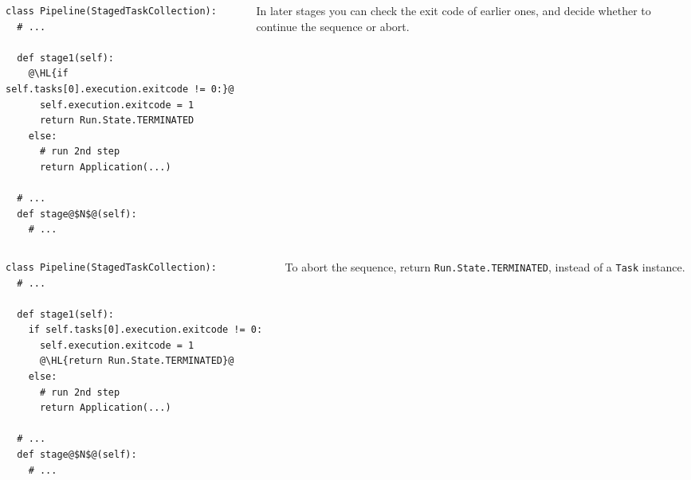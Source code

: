 \documentclass[english,serif,mathserif,xcolor=pdftex,dvipsnames,table]{beamer}
\begin{document}
\begin{frame}[fragile]
  \begin{columns}[c]
    \begin{column}{0.6\textwidth}
      \begin{lstlisting}
class Pipeline(StagedTaskCollection):
  # ...

  def stage1(self):
    @\HL{if self.tasks[0].execution.exitcode != 0:}@
      self.execution.exitcode = 1
      return Run.State.TERMINATED
    else:
      # run 2nd step
      return Application(...)

  # ...
  def stage@$N$@(self):
    # ...
      \end{lstlisting}
    \end{column}
    \begin{column}{0.4\textwidth}
      \raggedleft

      \+\+\+\+\+
      In later stages you can check the exit code of
      earlier ones, and decide whether to continue the sequence or
      abort.
    \end{column}
  \end{columns}
\end{frame}


\begin{frame}[fragile]
  \begin{columns}[c]
    \begin{column}{0.6\textwidth}
      \begin{lstlisting}
class Pipeline(StagedTaskCollection):
  # ...

  def stage1(self):
    if self.tasks[0].execution.exitcode != 0:
      self.execution.exitcode = 1
      @\HL{return Run.State.TERMINATED}@
    else:
      # run 2nd step
      return Application(...)

  # ...
  def stage@$N$@(self):
    # ...
      \end{lstlisting}
    \end{column}
    \begin{column}{0.4\textwidth}
      \raggedleft

      \+\+\+\+\+
      To abort the sequence, return \texttt{Run.State.TERMINATED},
      instead of a \texttt{Task} instance.
    \end{column}
  \end{columns}
\end{frame}
\end{document}
